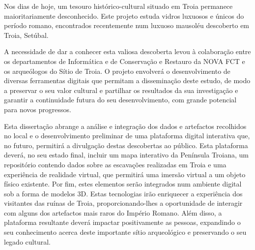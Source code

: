 
%

Nos dias de hoje, um tesouro histórico-cultural situado em Troia permanece maioritariamente desconhecido.  
Este projeto estuda vidros luxuosos e únicos do período romano, encontrados recentemente num luxuoso mausoléu descoberto em Troia, Setúbal.


A necessidade de dar a conhecer esta valiosa descoberta levou à colaboração entre os departamentos de Informática e de Conservação e Restauro da NOVA FCT e os arqueólogos do Sítio de Troia. O projeto envolverá o desenvolvimento de diversas ferramentas digitais que permitam a disseminação deste estudo, de modo a preservar o seu valor cultural e partilhar os resultados da sua investigação
e garantir a continuidade futura do seu desenvolvimento, com grande potencial para novos progressos.

Esta dissertação abrange a análise e integração dos dados e artefactos recolhidos no local e o desenvolvimento preliminar de uma plataforma digital interativa que, no futuro, permitirá a divulgação destas descobertas ao público.
Esta plataforma deverá, no seu estado final, incluir um mapa interativo da Península Troiana, um repositório contendo dados sobre as escavações realizadas em Troia e uma experiência de realidade virtual, que permitirá uma imersão virtual a um objeto físico existente. 
Por fim, estes elementos serão integrados num ambiente digital sob a forma de modelos 3D.
Estas tecnologias irão enriquecer a experiência dos visitantes das ruínas de Troia, proporcionando-lhes a oportunidade de interagir com alguns dos artefactos mais raros do Império Romano. 
Além disso, a plataforma resultante deverá impactar positivamente as pessoas, expandindo o seu conhecimento acerca deste importante sítio arqueológico e preservando o seu legado cultural.


